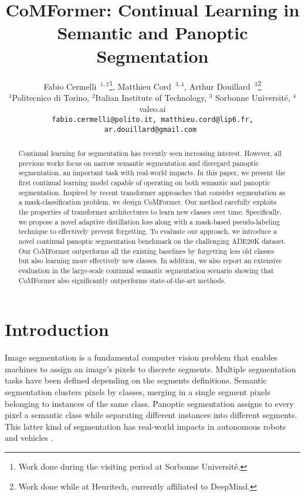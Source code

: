 \documentclass[10pt,twocolumn,letterpaper]{article}
\begin{document}
\title{\vspace{-2em}CoMFormer: Continual Learning in Semantic and Panoptic Segmentation}


\author{
Fabio Cermelli\ $^{1,2}$\thanks{Work done during the visiting period at Sorbonne Université.}, Matthieu Cord\ $^{3,4}$, Arthur Douillard\ $^{3}$\thanks{Work done while at Heuritech, currently affiliated to DeepMind.}\\
$^1$Politecnico di Torino, $^2$Italian Institute of Technology, $^3$ Sorbonne Université, $^4$ valeo.ai\\
{\tt\small fabio.cermelli@polito.it, matthieu.cord@lip6.fr, ar.douillard@gmail.com } \\
}

\maketitle

\begin{abstract}
Continual learning for segmentation has recently seen increasing interest. However, all previous works focus on narrow semantic segmentation and disregard panoptic segmentation, an important task with  real-world impacts. In this paper, we present the first continual learning model capable of operating on both semantic and panoptic segmentation. 
Inspired by recent transformer approaches that consider segmentation as a mask-classification problem, we design CoMFormer.
Our method carefully exploits the properties of transformer architectures to learn new classes over time. Specifically, we propose a novel adaptive distillation loss along with a mask-based pseudo-labeling technique to effectively prevent forgetting.
To evaluate our approach, we introduce a novel continual panoptic segmentation benchmark on the challenging ADE20K dataset. 
Our CoMFormer outperforms all the existing baselines by forgetting less old classes but also learning more effectively new classes. In addition, we also report an extensive evaluation in the large-scale continual semantic segmentation scenario showing that CoMFormer also significantly outperforms state-of-the-art methods.
\end{abstract}

\section{Introduction}
\label{sec:intro}
Image segmentation is a fundamental computer vision problem that enables machines to assign an image's pixels to discrete segments. Multiple segmentation tasks have been defined depending on the segments definitions. Semantic segmentation clusters pixels by classes, merging in a single segment pixels belonging to instances of the same class. Panoptic segmentation assigns to every pixel a semantic class while separating different instances into different segments. This latter kind of segmentation has real-world impacts in autonomous robots and vehicles \cite{chen2021panoptic, neuhold2017mapillary}.
\end{document}
